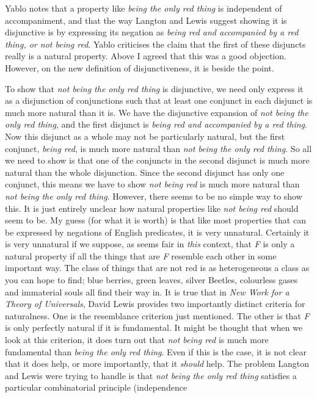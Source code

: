 \documentclass[
  11pt,
  letterpaper,
  DIV=11,
  numbers=noendperiod,
  twoside]{scrartcl}
\begin{document}
Yablo notes that a property like \emph{being the only red thing} is
independent of accompaniment, and that the way Langton and Lewis suggest
showing it is disjunctive is by expressing its negation as \emph{being
red and accompanied by a red thing, or not being red}. Yablo criticises
the claim that the first of these disjuncts really is a natural
property. Above I agreed that this was a good objection. However, on the
new definition of disjunctiveness, it is beside the point.

To show that \emph{not being the only red thing} is disjunctive, we need
only express it as a disjunction of conjunctions such that at least one
conjunct in each disjunct is much more natural than it is. We have the
disjunctive expansion of \emph{not being the only red thing}, and the
first disjunct is \emph{being red and accompanied by a red thing}. Now
this disjunct as a whole may not be particularly natural, but the first
conjunct, \emph{being red}, is much more natural than \emph{not being
the only red thing}. So all we need to show is that one of the conjuncts
in the second disjunct is much more natural than the whole disjunction.
Since the second disjunct has only one conjunct, this means we have to
show \emph{not being red} is much more natural than \emph{not being the
only red thing}. However, there seems to be no simple way to show this.
It is just entirely unclear how natural properties like \emph{not being
red} should seem to be. My guess (for what it is worth) is that like
most properties that can be expressed by negations of English
predicates, it is very unnatural. Certainly it is very unnatural if we
suppose, as seems fair in \emph{this} context, that \emph{F} is only a
natural property if all the things that are \emph{F} resemble each other
in some important way. The class of things that are not red is as
heterogeneous a class as you can hope to find; blue berries, green
leaves, silver Beetles, colourless gases and immaterial souls all find
their way in. It is true that in \emph{New Work for a Theory of
Universals}, David Lewis provides two importantly distinct criteria for
naturalness. One is the resemblance criterion just mentioned. The other
is that \emph{F} is only perfectly natural if it is fundamental. It
might be thought that when we look at this criterion, it does turn out
that \emph{not being red} is much more fundamental than \emph{being the
only red thing}. Even if this is the case, it is not clear that it does
help, or more importantly, that it \emph{should} help. The problem
Langton and Lewis were trying to handle is that \emph{not being the only
red thing} satisfies a particular combinatorial principle (independence
\end{document}
